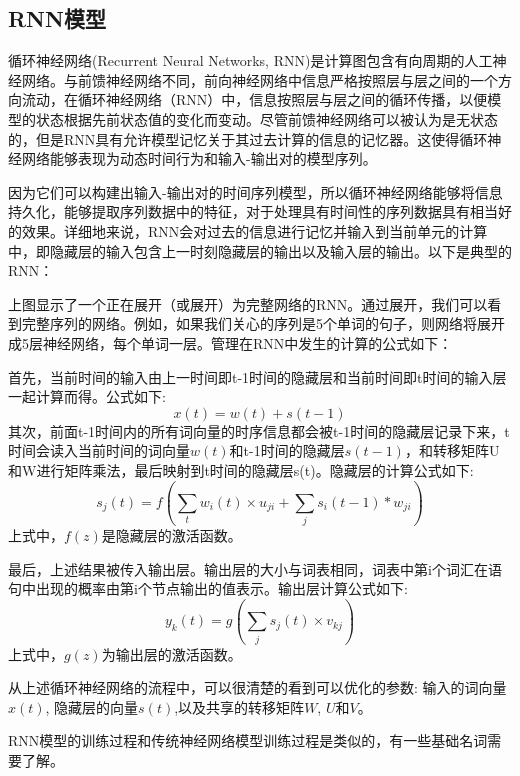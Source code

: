 \documentclass[a4paper,AutoFakeBold,oneside,12pt]{book}
\begin{document}
\subsection{RNN模型}
循环神经网络(Recurrent Neural Networks, RNN)是计算图包含有向周期的人工神经网络。与前馈神经网络不同，前向神经网络中信息严格按照层与层之间的一个方向流动，在循环神经网络（RNN）中，信息按照层与层之间的循环传播，以便模型的状态根据先前状态值的变化而变动。尽管前馈神经网络可以被认为是无状态的，但是RNN具有允许模型记忆关于其过去计算的信息的记忆器。这使得循环神经网络能够表现为动态时间行为和输入-输出对的模型序列。

因为它们可以构建出输入-输出对的时间序列模型，所以循环神经网络能够将信息持久化，能够提取序列数据中的特征，对于处理具有时间性的序列数据具有相当好的效果。详细地来说，RNN会对过去的信息进行记忆并输入到当前单元的计算中，即隐藏层的输入包含上一时刻隐藏层的输出以及输入层的输出。以下是典型的RNN：


上图显示了一个正在展开（或展开）为完整网络的RNN。通过展开，我们可以看到完整序列的网络。例如，如果我们关心的序列是5个单词的句子，则网络将展开成5层神经网络，每个单词一层。管理在RNN中发生的计算的公式如下：

首先，当前时间的输入由上一时间即t-1时间的隐藏层和当前时间即t时间的输入层一起计算而得。公式如下:
$$ x(t)=w(t)+s(t-1) $$
其次，前面t-1时间内的所有词向量的时序信息都会被t-1时间的隐藏层记录下来，t时间会读入当前时间的词向量$w(t)$和t-1时间的隐藏层$s(t-1)$，和转移矩阵U和W进行矩阵乘法，最后映射到t时间的隐藏层s(t)。隐藏层的计算公式如下:
$$ s_j{(t)}=f(\sum_t{w_i{(t)} \times u_{ji}} + \sum_j{s_i{(t-1)}*w_{ji}}) $$
上式中，$ f(z) $是隐藏层的激活函数。

最后，上述结果被传入输出层。输出层的大小与词表相同，词表中第i个词汇在语句中出现的概率由第i个节点输出的值表示。输出层计算公式如下:
$$ y_k{(t)}=g(\sum_j{s_j{(t)} \times v_{kj}}) $$
上式中，$g(z)$为输出层的激活函数。



从上述循环神经网络的流程中，可以很清楚的看到可以优化的参数: 输入的词向量$x(t)$, 隐藏层的向量$s(t)$,以及共享的转移矩阵$W$, $U$和$V$。

RNN模型的训练过程和传统神经网络模型训练过程是类似的，有一些基础名词需要了解。
\end{document}
